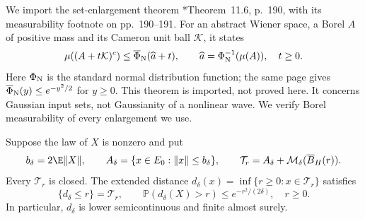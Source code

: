 We import the set-enlargement theorem
\cite{friz.hairer:20:course}*{Theorem~11.6, p.~190},
with its measurability footnote on pp.~190--191.
For an abstract Wiener space, a Borel $A$ of positive mass and
its Cameron unit ball $\mathcal K$, it states
\[
  \mu((A+t\mathcal K)^c)
  \le\overline\Phi_{\rm N}(\widehat a+t),\qquad
  \widehat a=\Phi_{\rm N}^{-1}(\mu(A)),\quad t\ge0 .
\]
Here $\Phi_{\rm N}$ is the standard normal distribution function;
the same page gives $\overline\Phi_{\rm N}(y)\le e^{-y^2/2}$
for $y\ge0$. This theorem is imported, not proved here.
It concerns Gaussian input sets, not Gaussianity of a nonlinear wave.
We verify Borel measurability of every enlargement we use.

\begin{lemma}
  \label{L:tube-closed-geometry}
  Suppose the law of $X$ is nonzero and put
  \[
    b_\delta=2\E\|X\|,\qquad
    A_\delta=\{x\in E_0:\|x\|\le b_\delta\},\qquad
    \mathcal T_r=A_\delta+\mathcal M_\delta(\overline B_H(r)).
  \]
  Every $\mathcal T_r$ is closed.
  The extended distance
  $d_\delta(x)=\inf\{r\ge0:x\in\mathcal T_r\}$ satisfies
  \begin{equation}\label{E:tube-attained-radius}
    \{d_\delta\le r\}=\mathcal T_r,\qquad
    \mathbb P(d_\delta(X)>r)\le e^{-r^2/(2\delta)},\quad r\ge0 .
  \end{equation}
  In particular, $d_\delta$ is lower semicontinuous and finite almost surely.
\end{lemma}

